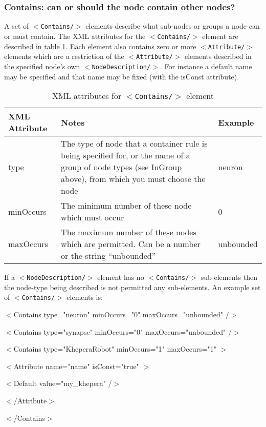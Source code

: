 \documentclass[pdftex,a4paper]{article}
\newcommand{\XML}[2][]{{\tt \small $<$#2#1/$>$}}
\newcommand{\XMLtext}[1]{
  \begin{tt}
    \begin{small}
      \begin{list}{}{
          \setlength{\topsep}{0pt}
          \setlength{\partopsep}{0pt}
          \setlength{\itemsep}{0pt}
          \setlength{\parsep}{0pt}
          \setlength{\leftmargin}{2em}
          \setlength{\rightmargin}{2em}
          \setlength{\labelsep}{0pt}
        }
      \item #1
      \end{list}
    \end{small}
  \end{tt}
}
\newcommand{\XMLfull}[3][]{\XMLtext{$<$#2#1$>$
    #3
  \item $<$/#2$>$}}
\newcommand{\XMLsimple}[2][]{\XMLtext{$<$#2#1/$>$}}
\begin{document}
\subsubsection{Contains: can or should the node contain other nodes?}

A set of \XML{Contains} elements describe what sub-nodes or groups a
node can or must contain.  The XML attributes for the \XML{Contains}
element are described in table \ref{contains}. Each element also
contains zero or more \XML{Attribute} elements which are a restriction
of the \XML{Attribute} elements described in the specified node's own
\XML{NodeDescription}. For instance a default name may be specified and
that name may be fixed (with the isConst attribute).

\begin{table}[!h]
  \begin{center}
    \caption{XML attributes for \XML{Contains} element}
    \label{contains}
    \begin{tabular}{|l|p{6cm}|l|}
      \hline

      \textbf{XML Attribute} & \textbf{Notes} & \textbf{Example}\\

      \hline

      type & The type of node that a container rule is being specified
      for, or the name of a group of node types (see InGroup above),
      from which you must choose the node & neuron\\

      \hline

      minOccurs & The minimum number of these node which must occur & 0\\

      \hline

      maxOccurs & The maximum number of these nodes which are
      permitted. Can be a number or the string ``unbounded'' &
      unbounded\\

      \hline
    \end{tabular}
  \end{center}
\end{table}

If a \XML{NodeDescription} element has no \XML{Contains} sub-elements
then the node-type being described is not permitted any
sub-elements. An example set of \XML{Contains} elements is:

\XMLsimple[ type="neuron" minOccurs="0" maxOccurs="unbounded" ]{Contains}
\XMLsimple[ type="synapse" minOccurs="0" maxOccurs="unbounded" ]{Contains}
\XMLfull[ type="KheperaRobot" minOccurs="1" maxOccurs="1" ]{Contains}{
  \XMLfull[ name="name" isConst="true" ]{Attribute}{
    \XMLsimple[ value="my\_khepera" ]{Default}
  }
}
\end{document}

